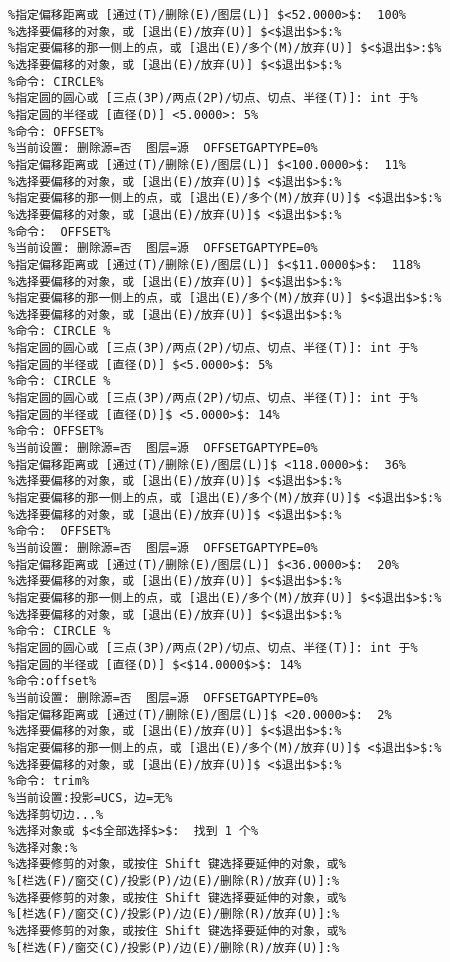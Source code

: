 \begin{lstlisting}
%指定偏移距离或 [通过(T)/删除(E)/图层(L)] $<52.0000>$:  100%
%选择要偏移的对象，或 [退出(E)/放弃(U)] $<$退出$>$:%
%指定要偏移的那一侧上的点，或 [退出(E)/多个(M)/放弃(U)] $<$退出$>:$%
%选择要偏移的对象，或 [退出(E)/放弃(U)] $<$退出$>$:%
%命令: CIRCLE%
%指定圆的圆心或 [三点(3P)/两点(2P)/切点、切点、半径(T)]: int 于%
%指定圆的半径或 [直径(D)] <5.0000>: 5%
%命令: OFFSET%
%当前设置: 删除源=否  图层=源  OFFSETGAPTYPE=0%
%指定偏移距离或 [通过(T)/删除(E)/图层(L)] $<100.0000>$:  11%
%选择要偏移的对象，或 [退出(E)/放弃(U)]$ <$退出$>$:%
%指定要偏移的那一侧上的点，或 [退出(E)/多个(M)/放弃(U)]$ <$退出$>$:%
%选择要偏移的对象，或 [退出(E)/放弃(U)]$ <$退出$>$:%
%命令:  OFFSET%
%当前设置: 删除源=否  图层=源  OFFSETGAPTYPE=0%
%指定偏移距离或 [通过(T)/删除(E)/图层(L)] $<$11.0000$>$:  118%
%选择要偏移的对象，或 [退出(E)/放弃(U)] $<$退出$>$:%
%指定要偏移的那一侧上的点，或 [退出(E)/多个(M)/放弃(U)] $<$退出$>$:%
%选择要偏移的对象，或 [退出(E)/放弃(U)] $<$退出$>$:%
%命令: CIRCLE %
%指定圆的圆心或 [三点(3P)/两点(2P)/切点、切点、半径(T)]: int 于%
%指定圆的半径或 [直径(D)] $<5.0000>$: 5%
%命令: CIRCLE %
%指定圆的圆心或 [三点(3P)/两点(2P)/切点、切点、半径(T)]: int 于%
%指定圆的半径或 [直径(D)]$ <5.0000>$: 14%
%命令: OFFSET%
%当前设置: 删除源=否  图层=源  OFFSETGAPTYPE=0%
%指定偏移距离或 [通过(T)/删除(E)/图层(L)]$ <118.0000>$:  36%
%选择要偏移的对象，或 [退出(E)/放弃(U)]$ <$退出$>$:%
%指定要偏移的那一侧上的点，或 [退出(E)/多个(M)/放弃(U)]$ <$退出$>$:%
%选择要偏移的对象，或 [退出(E)/放弃(U)]$ <$退出$>$:%
%命令:  OFFSET%
%当前设置: 删除源=否  图层=源  OFFSETGAPTYPE=0%
%指定偏移距离或 [通过(T)/删除(E)/图层(L)] $<36.0000>$:  20%
%选择要偏移的对象，或 [退出(E)/放弃(U)] $<$退出$>$:%
%指定要偏移的那一侧上的点，或 [退出(E)/多个(M)/放弃(U)] $<$退出$>$:%
%选择要偏移的对象，或 [退出(E)/放弃(U)] $<$退出$>$:%
%命令: CIRCLE %
%指定圆的圆心或 [三点(3P)/两点(2P)/切点、切点、半径(T)]: int 于%
%指定圆的半径或 [直径(D)] $<$14.0000$>$: 14%
%命令:offset%
%当前设置: 删除源=否  图层=源  OFFSETGAPTYPE=0%
%指定偏移距离或 [通过(T)/删除(E)/图层(L)]$ <20.0000>$:  2%
%选择要偏移的对象，或 [退出(E)/放弃(U)] $<$退出$>$:%
%指定要偏移的那一侧上的点，或 [退出(E)/多个(M)/放弃(U)]$ <$退出$>$:%
%选择要偏移的对象，或 [退出(E)/放弃(U)]$ <$退出$>$:%
%命令: trim%
%当前设置:投影=UCS，边=无%
%选择剪切边...%
%选择对象或 $<$全部选择$>$:  找到 1 个%
%选择对象:%
%选择要修剪的对象，或按住 Shift 键选择要延伸的对象，或%
%[栏选(F)/窗交(C)/投影(P)/边(E)/删除(R)/放弃(U)]:%
%选择要修剪的对象，或按住 Shift 键选择要延伸的对象，或%
%[栏选(F)/窗交(C)/投影(P)/边(E)/删除(R)/放弃(U)]:%
%选择要修剪的对象，或按住 Shift 键选择要延伸的对象，或%
%[栏选(F)/窗交(C)/投影(P)/边(E)/删除(R)/放弃(U)]:%

\end{lstlisting}
